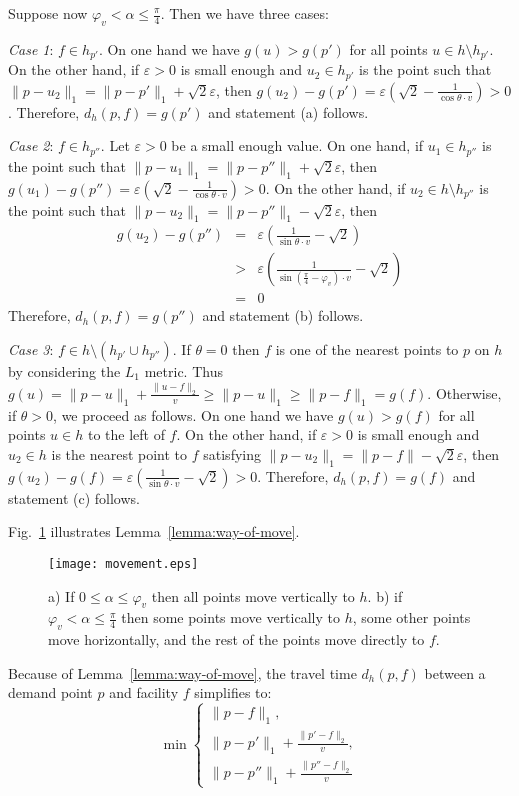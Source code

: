 \documentclass[11pt,a4paper,oneside,onecolumn]{article}
\def\eps{\varepsilon}
\def\QED{\ensuremath{{\square}}}
\def\markatright#1{\leavevmode\unskip\nobreak\quad\hspace*{\fill}{#1}}
\newenvironment{proof}
{\begin{trivlist}\item[\hskip\labelsep{\bf Proof.}]}
{\markatright{\QED}\end{trivlist}}
\begin{document}
\begin{proof}
Suppose now $\varphi_v<\alpha\leq\frac{\pi}{4}$. Then we have three
cases:

{\em Case 1}: $f\in h_{p'}$. On one hand we have $g(u)>g(p')$ for
all points $u\in h\setminus h_{p'}$. On the other hand, if $\eps>0$
is small enough and $u_2\in h_{p'}$ is the point
such that $\|p-u_2\|_1=\|p-p'\|_1+\sqrt{2}\eps$, then
$g(u_2)-g(p')=\eps\left(\sqrt{2} -\frac{1}{\cos\theta \cdot
v}\right)>0$. Therefore, $d_h(p,f)=g(p')$ and statement (a) follows.

{\em Case 2}: $f\in h_{p''}$. Let $\eps>0$ be a small enough value.
On one hand, if $u_1\in h_{p''}$ is the point
such that $\|p-u_1\|_1=\|p-p''\|_1+\sqrt{2}\eps$, then
$g(u_1)-g(p'')=\eps\left(\sqrt{2} -\frac{1}{\cos\theta\cdot
v}\right)>0$. 
On the other hand, if $u_2\in h\setminus h_{p''}$ is the point
such that $\|p-u_2\|_1=\|p-p''\|_1-\sqrt{2}\eps$, then
\begin{eqnarray*}
g(u_2)-g(p'') & = & \eps\left(\frac{1}{\sin\theta\cdot v}-\sqrt{2}\right)\\
 & > & \eps\left(\frac{1}{\sin\left(\frac{\pi}{4}-\varphi_v\right)\cdot
v}-\sqrt{2}\right)\\
 & = & 0
\end{eqnarray*}
Therefore, $d_h(p,f)=g(p'')$ and statement (b)
follows.

{\em Case 3}: $f\in h\setminus (h_{p'}\cup h_{p''})$. If $\theta=0$
then $f$ is one of the nearest points to $p$ on $h$ by considering
the $L_1$ metric. Thus
$g(u)=\|p-u\|_1+\frac{\|u-f\|_2}{v}\geq\|p-u\|_1\geq\|p-f\|_1=g(f)$.
Otherwise, if $\theta>0$, we proceed as follows. On one hand we have
$g(u)>g(f)$ for all points $u\in h$ to the left of $f$. On the other
hand, if $\eps>0$ is small enough and $u_2\in h$ is the nearest
point to $f$ satisfying $\|p-u_2\|_1=\|p-f\|-\sqrt{2}\eps$, then
$g(u_2)-g(f)=\eps\left(\frac{1}{\sin\theta\cdot v}-\sqrt{2}\right)>0$.
Therefore, $d_h(p,f)=g(f)$ and statement (c) follows.
\end{proof}
Fig.~\ref{fig:movement} illustrates Lemma~\ref{lemma:way-of-move}.
\begin{figure}[h]
  \centering
  \texttt{[image: movement.eps]}
  \caption{\small{a) If $0\leq\alpha\leq\varphi_v$ then all points
  move vertically to $h$.
  b) if $\varphi_v<\alpha\leq\frac{\pi}{4}$ then some points move
  vertically to $h$, some other points move horizontally, and the rest of the points move
  directly to $f$.}}
  \label{fig:movement}
\end{figure}
Because of Lemma~\ref{lemma:way-of-move}, the travel time $d_h(p,f)$ between a
demand point $p$ and facility $f$ simplifies to:
\begin{equation}\label{eq1}
\min\left\{
\begin{array}{l}
\|p-f\|_1,\\
\|p-p'\|_1+\frac{\|p'-f\|_2}{v},\\
\|p-p''\|_1+\frac{\|p''-f\|_2}{v}
\end{array}
\right.
\end{equation}
\end{document}
